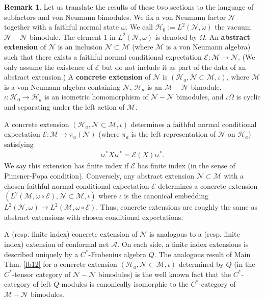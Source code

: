 \documentclass[11pt,b5paper,notitlepage]{article}
\theoremstyle{definition}
\newtheorem{rem}[df]{Remark}
\theoremstyle{plain}
\newcommand{\mc}{\mathcal}
\numberwithin{equation}{section}
\begin{document}
\begin{rem}\label{lb15}
Let us translate the results of these two sections to the language of subfactors and von Neumann bimodules. We fix a von Neumann factor $\mc N$ together with a faithful normal state $\omega$. We call $\mc H_0:=L^2(\mc N,\omega)$ the vacuum $\mc N-\mc N$ bimodule. The element $1$ in $L^2(\mc N,\omega)$ is denoted by $\Omega$. An \textbf{abstract extension} of $\mc N$ is an inclusion $\mc N\subset\mc M$ (where $\mc M$ is a von Neumann algebra) such that there exists a faithful normal conditional expectation $\mc E:\mc M\rightarrow\mc N$. (We only assume the existence of $\mc E$ but do not include it as part of the data of an abstract extension.) A \textbf{concrete extension} of $\mc N$ is $(\mc H_a,\mc N\subset\mc M,\iota)$, where $\mc M$ is a von Neumann algebra containing $\mc N$, $\mc H_a$ is an $\mc M-\mc N$ bimodule, $\iota:\mc H_0\rightarrow\mc H_a$ is an isometric homomorphism of $\mc N-\mc N$ bimodules, and $\iota\Omega$ is cyclic and separating under the left action of $\mc M$.

A concrete extension $(\mc H_a,\mc N\subset\mc M,\iota)$ determines a faithful normal conditional expectation $\mc E:\mc M\rightarrow\pi_a(\mc N)$ (where $\pi_a$ is the left representation of $\mc N$ on $\mc H_a$) satisfying
\begin{align*}
\iota\iota^* X\iota\iota^*=\mc E(X)\iota\iota^*.	
\end{align*}
We say this extension has finite index if $\mc E$ has finite index (in the sense of Pimsner-Popa condition). Conversely, any abstract extension $\mc N\subset \mc M$ with a chosen faithful normal conditional expectation $\mc E$ determines a concrete extension $(L^2(\mc M,\omega\circ\mc E),\mc N\subset\mc M,\iota)$ where $\iota$ is the canonical embedding $L^2(\mc N,\omega)\rightarrow L^2(\mc M,\omega\circ\mc E)$. Thus, concrete extensions are roughly the same as abstract extensions with chosen conditional expectations. 

A (resp. finite index) concrete extension of $\mc N$ is analogous to a (resp. finite index) extension of conformal net $\mc A$.  On each side, a finite index extensions is described uniquely by a $C^*$-Frobenius algebra $Q$. The analogous result of Main Thm. \ref{lb12} for a  concrete extension $(\mc H_a,\mc N\subset\mc M,\iota)$ determined by $Q$ (in the $C^*$-tensor category of $\mc N-\mc N$ bimodules) is the well known fact that the $C^*$-category of left $Q$-modules is canonically isomorphic to the $C^*$-category of $\mc M-\mc N$ bimodules.


\end{rem}
\end{document}

